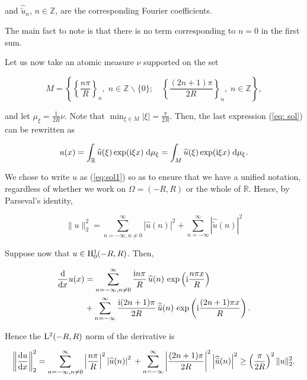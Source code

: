\documentclass{amsart}
\numberwithin{Theorem}{section}
\numberwithin{equation}{section}
\theoremstyle{definition}
\theoremstyle{remark}
\begin{document}
and $\widehat{\tilde{u}}_n$, $n \in \mathbb{Z}$, are the corresponding  Fourier coefficients.

The main fact to note is that there is no term corresponding to $n=0$ in the first sum.

Let us now take an atomic measure $\nu$ supported on the set

\begin{equation} \label{M}
M= \left \{  \left\{ \frac{n\pi }{R}\right\}_n,\; n \in \mathbb{Z} \backslash \{0\};\quad\left\{\frac{(2n+1)\pi}{2R} \right\}_n,\; n\in \mathbb{Z} \right\},
\end{equation}

and let $\mu_{\xi} = \frac{1}{2R}\nu$. Note that  $\min_{\xi \in M} |\xi| = \frac{\pi}{2R}$.
Then, the last expression (\ref{eq: sol}) can be rewritten as

\begin{equation} \label{eq:sol1}
u(x) = \int_{\mathbb{R}} \widehat{u}(\xi) \exp({\rm i} \xi x ) \; {\rm d}\mu_{\xi}  = \int_{M} \widehat{u}(\xi) \exp({\rm i} \xi x ) \; {\rm d}\mu_{\xi}.
\end{equation}

We chose to write  $u$ as (\ref{eq:sol1}) so as to ensure
that we have a unified notation, regardless of whether we work on $\Omega = (-R,R)$ or the whole of $\mathbb{R}$.
Hence, by Parseval's identity,

\[ \|u\|_2^2 = \sum_{n=-\infty, n \neq 0}^{\infty}  |\widehat{u}(n) |^2 +  \sum_{n=-\infty}^{\infty}  |\widehat{\tilde{u}}(n) |^2
\]

Suppose now that $u \in {{\rm H}}^1_0(-R,R)$.  Then,

\begin{align} 
 \frac{{\rm d}}{{\rm d}x} u (x) & =    \sum_{n=-\infty,  n\neq 0}^{\infty} \frac{{\rm i} n\pi}{R}\,\widehat{u}(n)\, \exp \left({\rm i}\frac{n\pi x}{R}\right) \nonumber \\ &  +  \sum_{n=-\infty }^{\infty} \frac{{\rm i} (2n+1)\pi }{2R}\,\widehat{\tilde{u}}(n)\, \exp\left({\rm i}\frac{(2n+1)\pi x}{R} \right)   \nonumber  .
 \end{align}

Hence the ${{\rm L}}^2(-R,R)$ norm of the derivative is

  \begin{equation} \label{eq:der1}
  \left\|\frac{{\rm d}u}{{\rm d}x}\right\|_2^2 =
\sum_{n=-\infty, n\neq 0}^{\infty}  \left|\frac{n\pi}{R}\right|^2 \left|\widehat{u}(n)\right|^2\\ +
 \sum_{n=-\infty}^{\infty}  \left |\frac{(2n+1)\pi}{2R}\right |^2\left|\widehat{\tilde{u}}(n)\right|^2  \geq  \left(\frac{\pi}{2R}\right)^2\|u\|_2^2.
  \end{equation}
\end{document}
